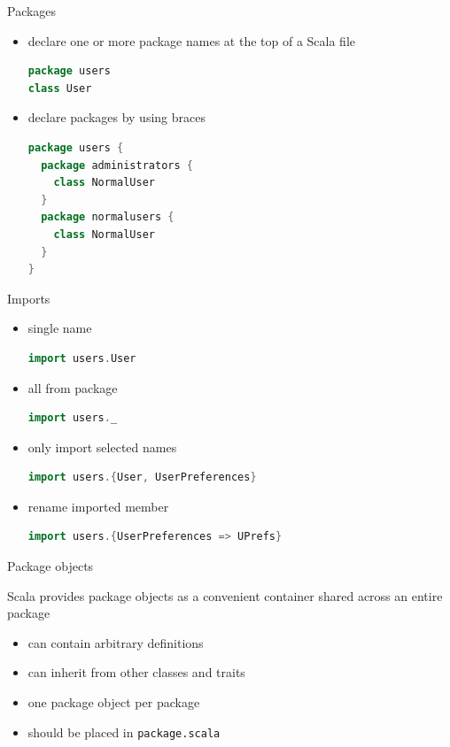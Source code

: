 \documentclass[aspectratio=169]{beamer}
\begin{document}
\begin{frame}[fragile]{Packages}
\begin{itemize}
  \item declare one or more package names at the top of a Scala file
    \begin{lstlisting}[style=scala,language=scala]
package users
class User
    \end{lstlisting}
    \pause
  \item declare packages by using braces
    \begin{lstlisting}[style=scala,language=scala]
package users {
  package administrators {
    class NormalUser
  }
  package normalusers {
    class NormalUser
  }
}
    \end{lstlisting}
\end{itemize}
\end{frame}

\begin{frame}[fragile]{Imports}
\begin{itemize}
\item single name
\begin{lstlisting}[style=scala,language=scala]
import users.User
\end{lstlisting}
\pause
\item all from package
\begin{lstlisting}[style=scala,language=scala]
import users._
\end{lstlisting}
\pause
\item only import selected names
\begin{lstlisting}[style=scala,language=scala]
import users.{User, UserPreferences}
\end{lstlisting}
\pause
\item rename imported member
\begin{lstlisting}[style=scala,language=scala]
import users.{UserPreferences => UPrefs}
\end{lstlisting}
\end{itemize}
\end{frame}

\begin{frame}{Package objects}
\begin{block}{}
Scala provides package objects as a convenient container shared across an entire package
\end{block}
\pause
\begin{itemize}
  \item can contain arbitrary definitions
\pause
  \item can inherit from other classes and traits
\pause
  \item one package object per package
\pause
  \item should be placed in \texttt{package.scala}
\end{itemize}
\end{frame}
\end{document}
